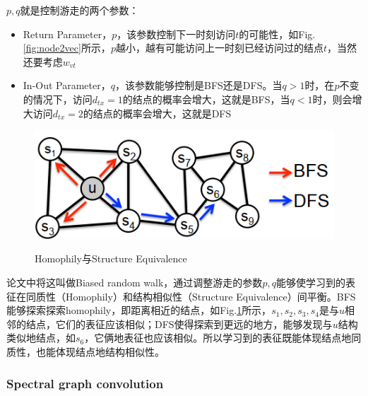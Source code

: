 $p, q$就是控制游走的两个参数：
\begin{itemize}
	\item Return Parameter，$p$，该参数控制下一时刻访问$t$的可能性，如Fig.\ref{fig:node2vec}所示，$p$越小，越有可能访问上一时刻已经访问过的结点$t$，当然还要考虑$w_{vt}$
	\item In-Out Parameter，$q$，该参数能够控制是BFS还是DFS。当$q>1$时，在$p$不变的情况下，访问$d_{tx} = 1$的结点的概率会增大，这就是BFS，当$q<1$时，则会增大访问$d_{tx} = 2$的结点的概率会增大，这就是DFS
\end{itemize}
\begin{figure}[h]
	\centering
	\includegraphics[width=.8\textwidth]{pics/node2vec2.png}
	\label{fig:node2vec2}
	\caption{Homophily与Structure Equivalence}
\end{figure}

论文中将这叫做Biased random walk，通过调整游走的参数$p,q$能够使学习到的表征在同质性（Homophily）和结构相似性（Structure Equivalence）间平衡。BFS能够探索探索homophily，即距离相近的结点，如Fig.\ref{fig:node2vec2}所示，$s_1, s_2, s_3, s_4$是与$u$相邻的结点，它们的表征应该相似；DFS使得探索到更远的地方，能够发现与$u$结构类似地结点，如$s_6$，它俩地表征也应该相似。所以学习到的表征既能体现结点地同质性，也能体现结点地结构相似性。

\subsubsection{Spectral graph convolution}